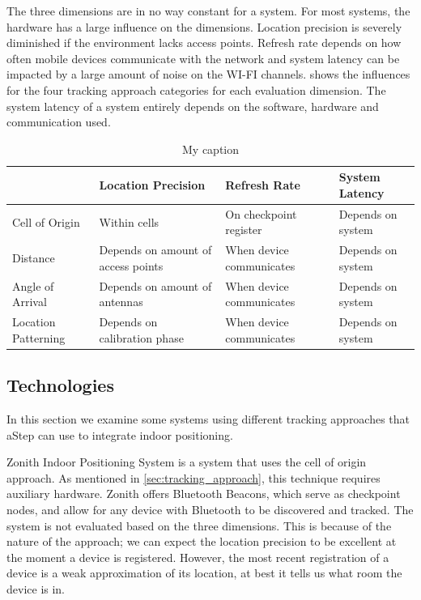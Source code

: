 The three dimensions are in no way constant for a system. For most systems, the hardware has a large influence on the dimensions. Location precision is severely diminished if the environment lacks access points. Refresh rate depends on how often mobile devices communicate with the network and system latency can be impacted by a large amount of noise on the WI-FI channels.  shows the influences for the four tracking approach categories for each evaluation dimension. The system latency of a system entirely depends on the software, hardware and communication used.

\begin{table}[]
\centering
\begin{tabular}{|l|p{4cm}|p{4cm}|p{3.5cm}|}
\hline
                    & Location Precision                 & Refresh Rate             & System Latency    \\ \hline
Cell of Origin      & Within cells                       & On checkpoint register   & Depends on system \\ \hline
Distance            & Depends on amount of access points & When device communicates & Depends on system \\ \hline
Angle of Arrival    & Depends on amount of antennas      & When device communicates & Depends on system \\ \hline
Location Patterning & Depends on calibration phase       & When device communicates & Depends on system \\ \hline
\end{tabular}
\caption{My caption}
\label{tab:evaluating_approaches}
\end{table}


\subsection{Technologies}
In this section we examine some systems using different tracking approaches that aStep can use to integrate indoor positioning.

Zonith Indoor Positioning System is a system that uses the cell of origin approach. As mentioned in \cref{sec:tracking_approach}, this technique requires auxiliary hardware. Zonith offers Bluetooth Beacons, which serve as checkpoint nodes, and allow for any device with Bluetooth to be discovered and tracked\cite{zonith}. The system is not evaluated based on the three dimensions. This is because of the nature of the approach; we can expect the location precision to be excellent at the moment a device is registered. However, the most recent registration of a device is a weak approximation of its location, at best it tells us what room the device is in.

